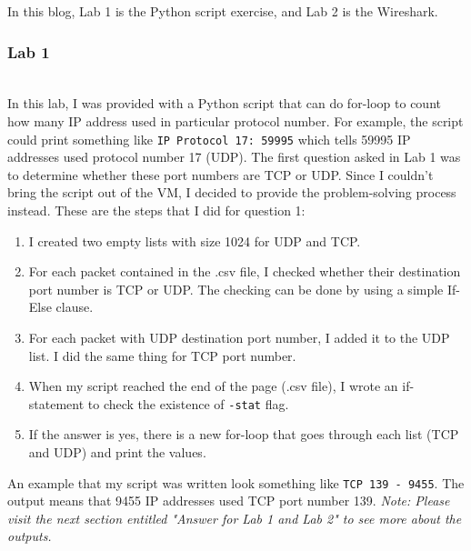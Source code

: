 \documentclass[letterpaper,10pt,titlepage,draftclsnofoot,onecolumn]{IEEEtran}
\begin{document}
In this blog, Lab 1 is the Python script exercise, and Lab 2 is the Wireshark.
\hfill\\
\subsubsection{Lab 1}
\hfill\\
In this lab, I was provided with a Python script that can do for-loop to count how many IP address used in particular protocol number.
For example, the script could print something like \verb|IP Protocol 17: 59995| which tells 59995 IP addresses used protocol number 17 (UDP).
The first question asked in Lab 1 was to determine whether these port numbers are TCP or UDP.
Since I couldn't bring the script out of the VM, I decided to provide the problem-solving process instead.
These are the steps that I did for question 1:
\begin{enumerate}
\item I created two empty lists with size 1024 for UDP and TCP.
\item For each packet contained in the .csv file, I checked whether their destination port number is TCP or UDP. The checking can be done by using a simple If-Else clause.
\item For each packet with UDP destination port number, I added it to the UDP list. I did the same thing for TCP port number. 
\item When my script reached the end of the page (.csv file), I wrote an if-statement to check the existence of \verb|-stat| flag. 
\item If the answer is yes, there is a new for-loop that goes through each list (TCP and UDP) and print the values. 
\end{enumerate}
An example that my script was written look something like \verb|TCP 139 - 9455|. 
The output means that 9455 IP addresses used TCP port number 139.
\textit{Note: Please visit the next section entitled "Answer for Lab 1 and Lab 2" to see more about the outputs.}
\end{document}
